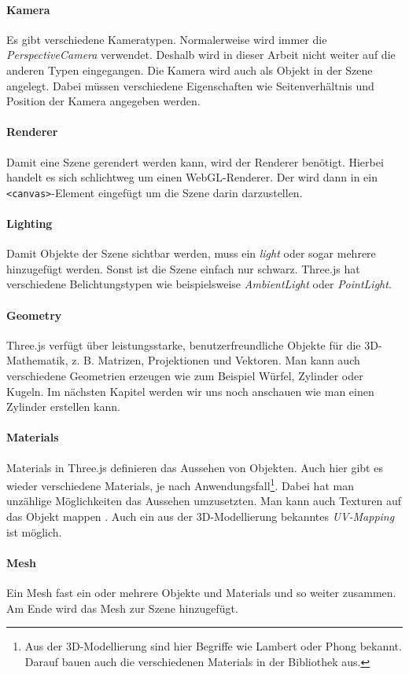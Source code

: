 \paragraph{Kamera}
Es gibt verschiedene Kameratypen. Normalerweise wird immer die \textit{PerspectiveCamera} verwendet. Deshalb wird in dieser Arbeit nicht weiter auf die anderen Typen eingegangen. Die Kamera wird auch als Objekt in der Szene angelegt. Dabei müssen verschiedene Eigenschaften wie Seitenverhältnis und Position der Kamera angegeben werden.
%
\paragraph{Renderer}
Damit eine Szene gerendert werden kann, wird der Renderer benötigt. Hierbei handelt es sich schlichtweg um einen WebGL-Renderer. Der wird dann in ein \texttt{<canvas>}-Element eingefügt um die Szene darin darzustellen.
%
\paragraph{Lighting}
Damit Objekte der Szene sichtbar werden, muss ein \textit{light} oder sogar mehrere hinzugefügt werden. Sonst ist die Szene einfach nur schwarz. Three.js hat verschiedene Belichtungstypen wie beispielsweise \textit{AmbientLight} oder \textit{PointLight}.
%
\paragraph{Geometry}
Three.js verfügt über leistungsstarke, benutzerfreundliche Objekte für die 3D-Mathematik, z. B. Matrizen, Projektionen und Vektoren. Man kann auch verschiedene Geometrien erzeugen wie zum Beispiel Würfel, Zylinder oder Kugeln. Im nächsten Kapitel werden wir uns noch anschauen wie man einen Zylinder erstellen kann.
%
\paragraph{Materials}
Materials in Three.js definieren das Aussehen von Objekten. Auch hier gibt es wieder verschiedene Materials, je nach Anwendungsfall\footnote{Aus der 3D-Modellierung sind hier Begriffe wie Lambert oder Phong bekannt. Darauf bauen auch die verschiedenen Materials in der Bibliothek aus.}. Dabei hat man unzählige Möglichkeiten das Aussehen umzusetzten. Man kann auch Texturen auf das Objekt \glqq mappen \grqq. Auch ein aus der 3D-Modellierung bekanntes \textit{UV-Mapping} ist möglich.
%
\paragraph{Mesh}
Ein Mesh fast ein oder mehrere Objekte und Materials und so weiter zusammen. Am Ende wird das Mesh zur Szene hinzugefügt.
%
